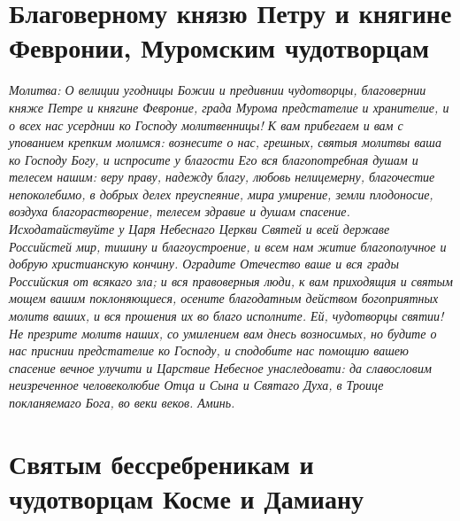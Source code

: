 \section{Благоверному князю Петру и княгине Февронии, Муромским чудотворцам}
 

\itshape Молитва:\normalfont{} О велиции угодницы Божии и предивнии чудотворцы, благовернии княже Петре и княгине Февроние, града Мурома предстателие и хранителие, и о всех нас усерднии ко Господу молитвенницы! К вам прибегаем и вам с упованием крепким молимся: вознесите о нас, грешных, святыя молитвы ваша ко Господу Богу, и испросите у благости Его вся благопотребная душам и телесем нашим: веру праву, надежду благу, любовь нелицемерну, благочестие непоколебимо, в добрых делех преуспеяние, мира умирение, земли плодоносие, воздуха благорастворение, телесем здравие и душам спасение. Исходатайствуйте у Царя Небеснаго Церкви Святей и всей державе Российстей мир, тишину и благоустроение, и всем нам житие благополучное и добрую христианскую кончину. Оградите Отечество ваше и вся грады Российския от всякаго зла; и вся правоверныя люди, к вам приходящия и святым мощем вашим поклоняющиеся, осените благодатным действом богоприятных молитв ваших, и вся прошения их во благо исполните. Ей, чудотворцы святии! Не презрите молитв наших, со умилением вам днесь возносимых, но будите о нас приснии предстателие ко Господу, и сподобите нас помощию вашею спасение вечное улучити и Царствие Небесное унаследовати: да славословим неизреченное человеколюбие Отца и Сына и Святаго Духа, в Троице покланяемаго Бога, во веки веков. Аминь.
\mychapterending


 

\section{Святым бессребреникам и чудотворцам Косме и Дамиану}
 


